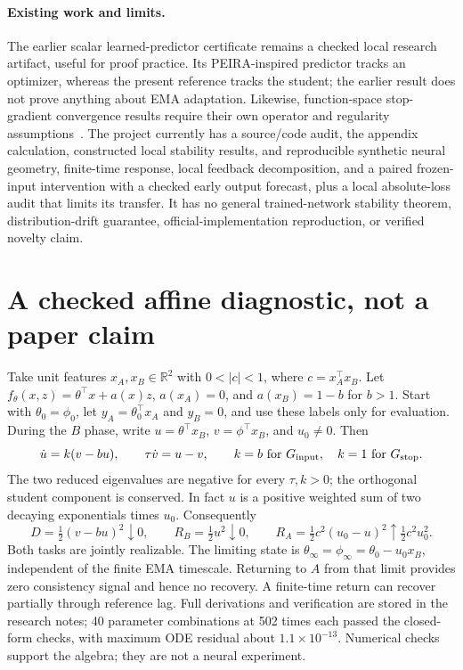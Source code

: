 \documentclass[11pt,a4paper]{article}
\newcommand{\R}{\mathbb{R}}
\begin{document}
\paragraph{Existing work and limits.}
The earlier scalar learned-predictor certificate remains a checked local
research artifact, useful for proof practice. Its PEIRA-inspired predictor
tracks an optimizer, whereas the present reference tracks the student;
the earlier result does not prove anything about EMA adaptation. Likewise,
function-space stop-gradient convergence results require their own operator
and regularity assumptions~\cite{stopgrads}. The project currently has a source/code audit, the appendix calculation,
constructed local stability results, and reproducible synthetic neural
geometry, finite-time response, local feedback decomposition, and a
paired frozen-input intervention with a checked early output forecast,
plus a local absolute-loss audit that limits its transfer.
It has no general trained-network stability theorem,
distribution-drift guarantee, official-implementation reproduction,
or verified novelty claim.

\medskip
{}

\appendix
\section{A checked affine diagnostic, not a paper claim}
Take unit features $x_A,x_B\in\R^2$ with $0<|c|<1$, where
$c=x_A^\top x_B$. Let $f_\theta(x,z)=\theta^\top x+a(x)z$,
$a(x_A)=0$, and $a(x_B)=1-b$ for $b>1$. Start with
$\theta_0=\phi_0$, let $y_A=\theta_0^\top x_A$ and $y_B=0$, and use
these labels only for evaluation. During the $B$ phase, write
$u=\theta^\top x_B$, $v=\phi^\top x_B$, and $u_0\ne0$. Then
\begin{equation}
 \dot u=k(v-bu),\qquad \tau\dot v=u-v,
 \qquad k=b\ \text{for }G_{\rm input},\quad k=1\ \text{for }G_{\rm stop}.
 \label{eq:toy}
\end{equation}
The two reduced eigenvalues are negative for every $\tau,k>0$; the
orthogonal student component is conserved. In fact $u$ is a positive
weighted sum of two decaying exponentials times $u_0$. Consequently
\begin{equation}
 D=\tfrac12(v-bu)^2\downarrow0,\qquad
 R_B=\tfrac12u^2\downarrow0,\qquad
 R_A=\tfrac12c^2(u_0-u)^2\uparrow\tfrac12c^2u_0^2.
 \label{eq:toyresult}
\end{equation}
Both tasks are jointly realizable. The limiting state is
$\theta_\infty=\phi_\infty=\theta_0-u_0x_B$, independent of the finite
EMA timescale. Returning to $A$ from that limit provides zero consistency
signal and hence no recovery. A finite-time return can recover partially
through reference lag. Full derivations and verification are stored in
the research notes; 40 parameter combinations at 502 times each passed
the closed-form checks, with maximum ODE residual about $1.1\times10^{-13}$.
Numerical checks support the algebra; they are not a neural experiment.
\end{document}
